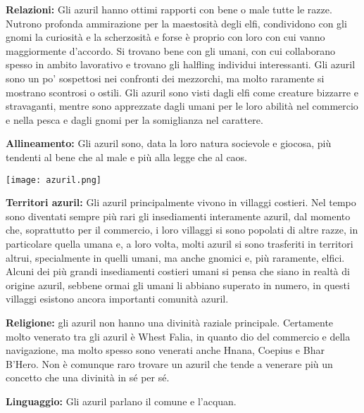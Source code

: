 \documentclass[a4paper]{report}
\begin{document}
\begin{multicols}{2}
\textbf{Relazioni:} Gli azuril hanno ottimi rapporti con bene o male tutte le razze. Nutrono profonda ammirazione per la maestosità degli elfi, condividono con gli gnomi la curiosità e la scherzosità e forse è proprio con loro con cui vanno maggiormente d’accordo. Si trovano bene con gli umani, con cui collaborano spesso in ambito lavorativo e trovano gli halfling individui interessanti. Gli azuril sono un po’ sospettosi nei confronti dei mezzorchi, ma molto raramente si mostrano scontrosi o ostili. Gli azuril sono visti dagli elfi come creature bizzarre e stravaganti, mentre sono apprezzate dagli umani per le loro abilità nel commercio e nella pesca e dagli gnomi per la somiglianza nel carattere.

\textbf{Allineamento:} Gli azuril sono, data la loro natura socievole e giocosa, più tendenti al bene che al male e più alla legge che al caos.

\begin{center}
	\texttt{[image: azuril.png]}
\end{center}

\textbf{Territori azuril:} Gli azuril principalmente vivono in villaggi costieri. Nel tempo sono diventati sempre più rari gli insediamenti interamente azuril, dal momento che, soprattutto per il commercio, i loro villaggi si sono popolati di altre razze, in particolare quella umana e, a loro volta, molti azuril si sono trasferiti in territori altrui, specialmente in quelli umani, ma anche gnomici e, più raramente, elfici. Alcuni dei più grandi insediamenti costieri umani si pensa che siano in realtà di origine azuril, sebbene ormai gli umani li abbiano superato in numero, in questi villaggi esistono ancora importanti comunità azuril.

\textbf{Religione:} gli azuril non hanno una divinità raziale principale. Certamente molto venerato tra gli azuril è Whest Falia, in quanto dio del commercio e della navigazione, ma molto spesso sono venerati anche Hnana, Coepius e Bhar B’Hero. Non è comunque raro trovare un azuril che tende a venerare più un concetto che una divinità in sé per sé.

\textbf{Linguaggio:} Gli azuril parlano il comune e l'acquan. 




\end{multicols}
\end{document}
